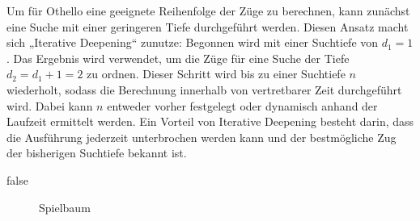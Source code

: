 Um für Othello eine geeignete Reihenfolge der Züge zu berechnen, kann zunächst eine Suche mit einer geringeren Tiefe
durchgeführt werden. Diesen Ansatz macht sich „Iterative Deepening“ zunutze: Begonnen wird mit einer Suchtiefe von
$d_1=1$. Das Ergebnis wird verwendet, um die Züge für eine Suche der Tiefe $d_2=d_1+1=2$ zu ordnen. Dieser Schritt wird
bis zu einer Suchtiefe $n$ wiederholt, sodass die Berechnung innerhalb von vertretbarer Zeit durchgeführt wird. Dabei
kann $n$ entweder vorher festgelegt oder dynamisch anhand der Laufzeit ermittelt werden. Ein Vorteil von Iterative
Deepening besteht darin, dass die Ausführung jederzeit unterbrochen werden kann und der bestmögliche Zug der bisherigen
Suchtiefe bekannt ist.
\cite[S.~4]{alphabetaefficiency}

\ifx false
\begin{figure}[]
    \centering
    \caption{Spielbaum}
    \label{fig:game_tree}
\end{figure}
\fi
